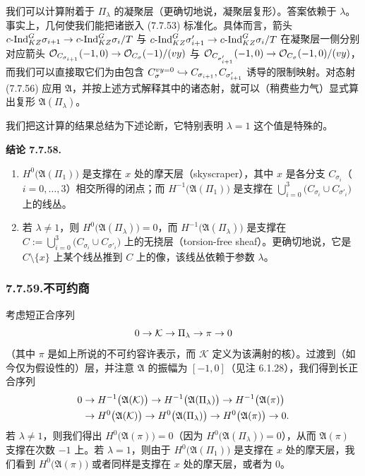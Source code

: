 我们可以计算附着于 $\Pi_\lambda$ 的凝聚层（更确切地说，凝聚层复形）。答案依赖于 $\lambda$。事实上，几何使我们能把诸嵌入 (7.7.53) 标准化。具体而言，箭头 $c\text{-}\mathrm{Ind}_{KZ}^G\sigma_{i+1}\rightarrow c\text{-}\mathrm{Ind}_{KZ}^G\sigma_i/T$ 与 $c\text{-}\mathrm{Ind}_{KZ}^G\sigma'_{i+1}\rightarrow c\text{-}\mathrm{Ind}_{KZ}^G\sigma_i/T$ 在凝聚层一侧分别对应箭头 $\mathcal{O}_{C_{\sigma_{i+1}}}(-1,0)\rightarrow\mathcal{O}_{C_\sigma}(-1)/(vy)$ 与 $\mathcal{O}_{C_{\sigma'_{i+1}}}(-1,0)\rightarrow\mathcal{O}_{C_\sigma}(-1,0)/(vy)$，而我们可以直接取它们为由包含 $C_\sigma^{vy=0}\hookrightarrow C_{\sigma_{i+1}},C_{\sigma'_{i+1}}$ 诱导的限制映射。对态射 (7.7.56) 应用 $\mathfrak A$，并按上述方式解释其中的诸态射，就可以（稍费些力气）显式算出复形 $\mathfrak A(\Pi_\lambda)$。

我们把这计算的结果总结为下述论断，它特别表明 $\lambda=1$ 这个值是特殊的。

\textbf{结论 7.7.58.}
\begin{enumerate}[(1)]
\item $H^0\bigl(\mathfrak A(\Pi_1)\bigr)$ 是支撑在 $x$ 处的摩天层（skyscraper），其中 $x$ 是各分支 $C_{\sigma_i}$（$i=0,\dots,3$）相交所得的闭点；而 $H^{-1}\bigl(\mathfrak A(\Pi_1)\bigr)$ 是支撑在 $\bigcup_{i=0}^{3}\bigl(C_{\sigma_i}\cup C_{\sigma'_i}\bigr)$ 上的线丛。
\item 若 $\lambda\neq1$，则 $H^0\bigl(\mathfrak A(\Pi_\lambda)\bigr)=0$，而 $H^{-1}\bigl(\mathfrak A(\Pi_\lambda)\bigr)$ 是支撑在 $C:=\bigcup_{i=0}^{3}\bigl(C_{\sigma_i}\cup C_{\sigma'_i}\bigr)$ 上的无挠层（torsion-free sheaf）。更确切地说，它是 $C\setminus\{x\}$ 上某个线丛推到 $C$ 上的像，该线丛依赖于参数 $\lambda$。
\end{enumerate}
\subsubsection*{7.7.59.\quad 不可约商}
考虑短正合序列
\[
0\rightarrow\mathcal K\rightarrow\Pi_\lambda\rightarrow\pi\rightarrow0
\]
（其中 $\pi$ 是如上所说的不可约容许表示，而 $\mathcal K$ 定义为该满射的核）。过渡到（如今仅为假设性的）层，并注意 $\mathfrak A$ 的振幅为 $[-1,0]$（见注 6.1.28），我们得到长正合序列
\[
\begin{aligned}
0&\rightarrow H^{-1}\bigl(\mathfrak A(\mathcal K)\bigr)\rightarrow H^{-1}\bigl(\mathfrak A(\Pi_\lambda)\bigr)\rightarrow H^{-1}\bigl(\mathfrak A(\pi)\bigr)\\
&\rightarrow H^0\bigl(\mathfrak A(\mathcal K)\bigr)\rightarrow H^0\bigl(\mathfrak A(\Pi_\lambda)\bigr)\rightarrow H^0\bigl(\mathfrak A(\pi)\bigr)\rightarrow0.
\end{aligned}
\]
若 $\lambda\neq1$，则我们得出 $H^0\bigl(\mathfrak A(\pi)\bigr)=0$（因为 $H^0\bigl(\mathfrak A(\Pi_\lambda)\bigr)=0$），从而 $\mathfrak A(\pi)$ 支撑在次数 $-1$ 上。若 $\lambda=1$，则由于 $H^0\bigl(\mathfrak A(\Pi_1)\bigr)$ 是支撑在 $x$ 处的摩天层，我们看到 $H^0\bigl(\mathfrak A(\pi)\bigr)$ 或者同样是支撑在 $x$ 处的摩天层，或者为 $0$。

